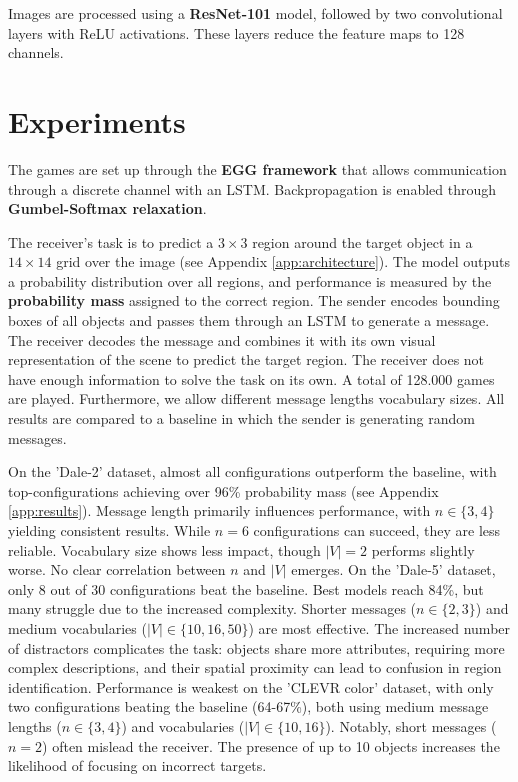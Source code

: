 \documentclass[11pt]{article}
\begin{document}

Images are processed using a \textbf{ResNet-101} model, followed by two
convolutional layers with ReLU activations. These layers reduce the
feature maps to 128 channels.


\section{Experiments}
The games are set up through the \textbf{EGG framework} \citep{Kharitonov2019} that allows communication through a discrete channel with an LSTM.
Backpropagation is enabled through \textbf{Gumbel-Softmax  relaxation}.

The receiver's task is to predict a $3 \times 3$ region around the target object in a $14 \times 14$ grid over the image (see Appendix \ref{app:architecture}).
The model outputs a probability distribution over all regions, and performance is measured by the \textbf{probability mass} assigned to the correct region.
The sender encodes bounding boxes of all objects and passes them through an LSTM to generate a message.
The receiver decodes the message and combines it with its own visual representation of the scene to predict the target region.
The receiver does not have enough information to solve the task on its own.
A total of 128.000 games are played.
Furthermore, we allow different message lengths vocabulary sizes.
All results are compared to a baseline in which the sender is generating random messages.

On the 'Dale-2' dataset, almost all configurations outperform the baseline, with top-configurations achieving over 96\% probability mass (see Appendix \ref{app:results}).
Message length primarily influences performance, with $n \in \{3,4\}$ yielding consistent results.
While $n=6$ configurations can succeed, they are less reliable.
Vocabulary size shows less impact, though $|V|=2$ performs slightly worse.
No clear correlation between $n$ and $|V|$ emerges.
On the 'Dale-5' dataset, only 8 out of 30 configurations beat the baseline.
Best models reach 84\%, but many struggle due to the increased complexity.
Shorter messages ($n \in \{2,3\}$) and medium vocabularies ($|V| \in \{10,16,50\}$) are most effective.
The increased number of distractors complicates the task: objects share more attributes, requiring more complex descriptions, and their spatial proximity can lead to confusion in region identification.
Performance is weakest on the 'CLEVR color' dataset, with only two configurations beating the baseline (64-67\%), both using medium message lengths ($n \in \{3,4\}$) and vocabularies ($|V| \in \{10,16\}$).
Notably, short messages ($n=2$) often mislead the receiver.
The presence of up to 10 objects increases the likelihood of focusing on incorrect targets.
\end{document}
